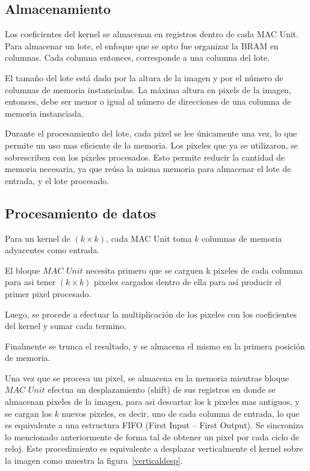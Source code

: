\subsection{Almacenamiento}\label{storage_subsecc}
Los coeficientes del kernel se almacenan en registros dentro de cada MAC Unit.
Para almacenar un lote, el enfoque que se opto fue organizar la BRAM en
columnas. Cada columna entonces, corresponde a una columna del lote.

El tamaño del lote está dado por la altura de la imagen y por el número de
columnas de memoria instanciadas.  La máxima altura en pixels de la imagen,
entonces, debe ser menor o igual al número de direcciones de una columna de
memoria instanciada.

Durante el procesamiento del lote, cada pixel se lee únicamente una vez, lo que permite un uso mas eficiente de la memoria. Los pixeles que ya se utilizaron, se sobrescriben con los pixeles procesados. 
Esto permite reducir la cantidad de memoria necesaria, ya que reúsa la misma memoria para almacenar el lote de entrada, y el lote procesado.

\subsection{Procesamiento de datos}  \label{processing_subsecc}
Para un kernel de  $(k \times k)$, cada MAC Unit toma $k$ columnas de memoria
adyacentes como entrada.

El bloque $MAC$ $Unit$ necesita primero que se carguen k pixeles de cada
columna para asi tener $(k \times k)$ pixeles cargados dentro de ella para así
producir el primer pixel procesado.

Luego, se procede a efectuar la multiplicación de los pixeles con los coeficientes del kernel y sumar cada termino.

Finalmente se trunca el resultado, y se almacena el mismo en la primera posición de memoria.

Una vez que se procesa un pixel, se almacena en la memoria mientras bloque $MAC$  $Unit$ efectua un desplazamiento (shift) de sus registros en donde se almacenan pixeles de la imagen, para asi descartar los k pixeles mas antiguos,
 y se cargan los $k$ nuevos pixeles, es decir, uno de cada columna de entrada, lo que es equivalente a una estructura FIFO (First Input – First Output).
Se sincroniza lo mencionado anteriormente de forma tal de obtener un pixel por
cada ciclo de reloj. Este procedimiento es equivalente a desplazar verticalmente
el kernel sobre la imagen como muestra la figura~\ref{verticaldesp}.

